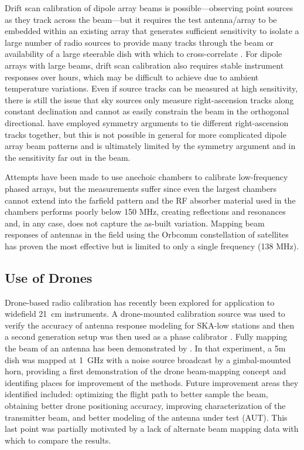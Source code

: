 \documentclass[preprint2,numberedappendix,tighten,twocolappendix]{aastex6}
\begin{document}
Drift scan calibration of dipole array beams is possible---observing point sources as they track across the beam---but it requires the test antenna/array to be embedded within an existing array that generates sufficient sensitivity to isolate a large number of radio sources to provide many tracks through the beam or availability of a large steerable dish with which to cross-correlate \citet{Berger:CHIME_beam_map2016-arxiv}.  For dipole arrays with large beams, drift scan calibration also requires stable instrument responses over hours, which may be difficult to achieve due to ambient temperature variations.  Even if source tracks can be measured at high sensitivity, there is still the issue that sky sources only measure right-ascension tracks along constant declination and cannot as easily constrain the beam in the orthogonal directional. \citet{Pober:2013p9942} have employed symmetry arguments to tie  different right-ascension tracks together, but this is not possible in general for more complicated dipole array beam patterns and is ultimately limited by the symmetry argument and in the sensitivity far out in the beam.   

Attempts have been made to use anechoic chambers to calibrate low-frequency phased arrays, but the measurements suffer since even the largest chambers cannot extend into the farfield pattern and the RF absorber material used in the chambers performs poorly below 150 MHz, creating reflections and resonances and, in any case, does not capture the as-built variation. Mapping beam responses of antennas in the field using the Orbcomm constellation of satellites has proven the most effective \citep{2015RaSc...50..614N,2016:NebenHERAdish} but is limited to only a single frequency (138 MHz).  

\subsection{Use of Drones}

Drone-based radio calibration has recently been explored for application to widefield 21~cm instruments. A drone-mounted calibration source was used to verify the accuracy of antenna response modeling for SKA-low stations \cite{2014IAWPL..13..169V} and then a second generation setup was then used as a phase calibrator \citep{2015ExA....39..405P}.  Fully mapping the beam of an antenna has been demonstrated by \citet{2015PASP..127.1131C}.  In that experiment, a 5m dish was mapped at 1~GHz with a noise source broadcast by a gimbal-mounted horn, providing a first demonstration of the drone beam-mapping concept and identifing places for improvement of the methods.   Future improvement areas they identified included: optimizing the flight path to better sample the beam, obtaining better drone positioning accuracy, improving characterization of the transmitter beam, and better modeling of the antenna under test (AUT). This last point was partially motivated by a lack of alternate beam mapping data with which to compare the results. 
\end{document}
